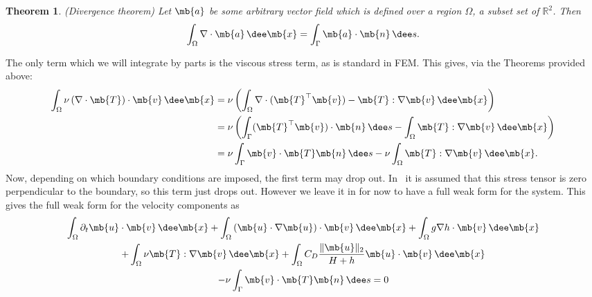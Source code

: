 \documentclass[11pt]{article}
\newtheorem{theorem}{Theorem}
\begin{document}
\begin{theorem}
  \label{thm:divergence}
  (Divergence theorem) Let $\mb{a}$ be some arbitrary vector field which is
  defined over a region $\Omega$, a subset set of $\mathbb{R}^2$. Then
  \[
    \int_\Omega \nabla \cdot \mb{a} \, \dee \mb{x} = 
    \int_\Gamma \mb{a} \cdot \mb{n} \, \dee s.
  \]
\end{theorem}

The only term which we will integrate by parts is the viscous stress term, as is
standard in FEM. This gives, via the Theorems provided above:
\begin{align*}
  \int_\Omega \nu \left(\nabla \cdot \mb{T}\right) \cdot \mb{v} \, \dee \mb{x}
  &= \nu \left( \int_\Omega \nabla \cdot (\mb{T}^\top \mb{v}) - \mb{T} : \nabla \mb{v} \, \dee \mb{x} \right) \\
  &= \nu \left(\int_\Gamma (\mb{T}^\top \mb{v}) \cdot \mb{n} \, \dee s
    - \int_\Omega \mb{T} : \nabla \mb{v} \, \dee \mb{x} \right) \\
  &= \nu \int_\Gamma \mb{v} \cdot \mb{T} \mb{n} \, \dee s
    - \nu \int_\Omega \mb{T} : \nabla \mb{v} \, \dee \mb{x}.
\end{align*}
Now, depending on which boundary conditions are imposed, the first term may drop
out. In~\citep{jacobs2015firedrakefluids} it is assumed that this stress tensor
is zero perpendicular to the boundary, so this term just drops out. However we
leave it in for now to have a full weak form for the system. This gives the full
weak form for the velocity components as
\begin{gather*}
  \int_\Omega \partial_t \mb{u} \cdot \mb{v} \, \dee \mb{x}
  + \int_\Omega \left(\mb{u} \cdot \nabla \mb{u}\right) \cdot \mb{v} \, \dee \mb{x}
  + \int_\Omega g \nabla h \cdot \mb{v} \, \dee \mb{x} \\
  + \int_\Omega \nu \mb{T} : \nabla \mb{v} \, \dee \mb{x}
  + \int_\Omega C_D \frac{\lVert \mb{u} \rVert_2}{H + h} \mb{u} \cdot \mb{v} \, \dee \mb{x} \\
  - \nu \int_\Gamma \mb{v} \cdot \mb{T} \mb{n} \, \dee s = 0
\end{gather*}
\end{document}
